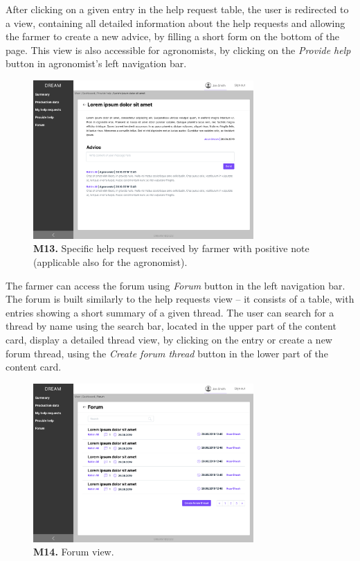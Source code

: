     
    After clicking on a given entry in the help request table, the user is redirected to a view, containing all detailed information about the help requests and allowing the farmer to create a new advice, by filling a short form on the bottom of the page. This view is also accessible for agronomists, by clicking on the \textit{Provide help} button in agronomist's left navigation bar.
    \begin{figure}[H]
        \centering
        \includegraphics[width=0.75\textwidth]{mockups/Farmer_Dashboard_Provide help_Request.png}
        \caption{\textbf{M13.} Specific help request received by farmer with positive note (applicable also for the agronomist).}
    \end{figure}
    
    The farmer can access the forum using \textit{Forum} button in the left navigation bar. The forum is built similarly to the help requests view – it consists of a table, with entries showing a short summary of a given thread. The user can search for a thread by name using the search bar, located in the upper part of the content card, display a detailed thread view, by clicking on the entry or create a new forum thread, using the \textit{Create forum thread} button in the lower part of the content card.
    \begin{figure}[H]
        \centering
        \includegraphics[width=0.75\textwidth]{mockups/Farmer_Dashboard_Forum.png}
        \caption{\textbf{M14.} Forum view.}
    \end{figure}
    
